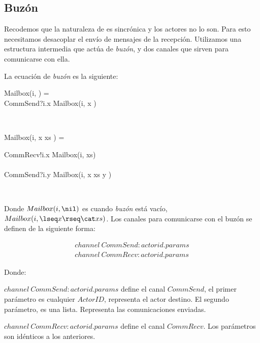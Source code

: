 \subsection{Buzón} 

Recodemos que la naturaleza de \CSP es sincrónica y los actores no lo son. Para esto necesitamos desacoplar el envío de mensajes de la recepción. Utilizamos una estructura intermedia que actúa de \textit{buzón}, y dos canales que sirven para comunicarse con ella.

La ecuación de \textit{buzón} es la siguiente:

\begin{process}
\begin{block}
Mailbox(i, \nil) = {} \\ \quad
CommSend?i.x \then Mailbox(i, \lseq x \rseq) 
\end{block} \\

\begin{block}
Mailbox(i, \lseq x \rseq \cat xs ) = {} \\ \quad 
  \begin{block}
    CommRecv!i.x \then Mailbox(i, xs) \\
    \Extchoice \\
    CommSend?i.y \then Mailbox(i, \lseq x \rseq \cat xs \cat \lseq y \rseq ) 
  \end{block}
\end{block} \\

\end{process}

Donde $Mailbox(i, \nil)$ es cuando \textit{buzón} está vacío, $Mailbox(i, \lseq x \rseq \cat xs )$. Los canales para comunicarse con el buzón se definen de la siguiente forma:

\begin{align*}
channel\ CommSend:actorid.params \\
channel\ CommRecv:actorid.params
\end{align*}

Donde:
\begin{description}
 \item $channel\ CommSend:actorid.params$ define el canal $CommSend$, el primer parámetro es cualquier $ActorID$, representa el actor destino. El segundo parámetro, es una lista. Representa las comunicaciones enviadas. 
 \item $channel\ CommRecv:actorid.params$ define el canal $CommRecv$. Los parámetros son idénticos a los anteriores.
\end{description}

